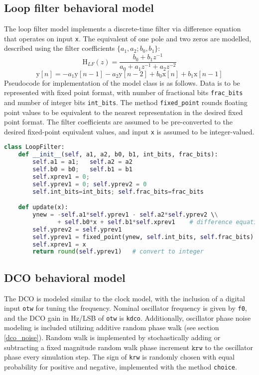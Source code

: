 \subsection{Loop filter behavioral model}
The loop filter model implements a discrete-time filter via difference equation that operates on input \texttt{x}. The equivalent of one pole and two zeros are modelled, described using the filter coefficients $\{a_1, a_2; b_0, b_1\}$:
\begin{equation}
\text{H}_{LF}(z) = \frac{b_0 + b_1z^{-1}}{a_0 + a_1z^{-1} + a_2z^{-2}}
\end{equation}
\begin{equation}
\text{y}[n] = -a_1 \text{y}[n-1]-a_2 \text{y}[n-2] + b_0\text{x}[n] + b_1\text{x}[n-1]
\end{equation}
Pseudocode for implementation of the model class is as follows. Data is to be represented with fixed point format, with number of fractional bits \texttt{frac\_bits} and number of integer bits \texttt{int\_bits}. The method \texttt{fixed\_point} rounds floating point values to be equivalent to the nearest representation in the desired fixed point format. The filter coefficients are assumed to be pre-converted to the desired fixed-point equivalent values, and input \texttt{x} is assumed to be integer-valued.
\begin{lstlisting}[language={Python}, caption={Loop filter behavioral model.}, label={lf_code}]
class LoopFilter:
	def __init__(self, a1, a2, b0, b1, int_bits, frac_bits):
		self.a1 = a1;	self.a2 = a2
		self.b0 = b0;	self.b1 = b1
		self.xprev1 = 0;	
		self.yprev1 = 0; self.yprev2 = 0
		self.int_bits=int_bits;	self.frac_bits=frac_bits

	def update(x):
		ynew = -self.a1*self.yprev1 - self.a2*self.yprev2 \\
			   + self.b0*x + self.b1*self.xprev1	# difference equation
		self.yprev2 = self.yprev1	
		self.yprev1 = fixed_point(ynew, self.int_bits, self.frac_bits)
		self.xprev1 = x
		return round(self.yprev1)	# convert to integer
\end{lstlisting}

\subsection{DCO behavioral model}
The DCO is modeled similar to the clock model, with the inclusion of a digital input \texttt{otw} for tuning the frequency. Nominal oscillator frequency is given by \texttt{f0}, and the DCO gain in Hz/LSB of \texttt{otw} is \texttt{kdco}. Additionally, oscillator phase noise modeling is included utilizing additive random phase walk (see section \ref{dco_noise}). Random walk is implemented by stochastically adding or subtracting a fixed magnitude random walk phase increment $\texttt{krw}$ to the oscillator phase every simulation step. The sign of \texttt{krw} is randomly chosen with equal probability for positive and negative, implemented with the method \texttt{choice}.


